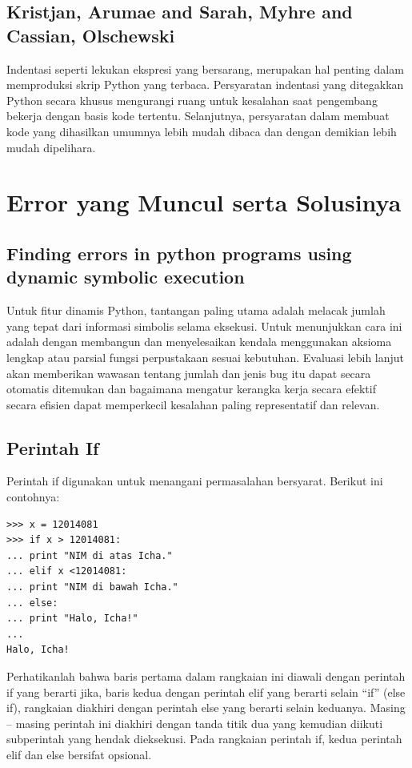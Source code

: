 \documentclass[12pt]{article}
\begin{document}
\subsection{Kristjan, Arumae and Sarah, Myhre and Cassian, Olschewski}
Indentasi seperti lekukan ekspresi yang bersarang, merupakan hal penting dalam memproduksi skrip Python yang terbaca. Persyaratan indentasi yang ditegakkan Python secara khusus mengurangi ruang untuk kesalahan saat pengembang bekerja dengan basis kode tertentu. Selanjutnya, persyaratan dalam membuat kode yang dihasilkan umumnya lebih mudah dibaca dan dengan demikian lebih mudah dipelihara\cite{kristjansoccer}.


\section{Error yang Muncul serta Solusinya}

\subsection{Finding errors in python programs using dynamic symbolic execution}
Untuk fitur dinamis Python, tantangan paling utama adalah melacak jumlah yang tepat dari informasi simbolis selama eksekusi. Untuk menunjukkan cara ini adalah dengan membangun dan menyelesaikan kendala menggunakan aksioma lengkap atau parsial fungsi perpustakaan sesuai kebutuhan. Evaluasi lebih lanjut akan memberikan wawasan tentang jumlah dan jenis bug itu dapat secara otomatis ditemukan dan bagaimana mengatur kerangka kerja secara efektif secara efisien dapat memperkecil kesalahan paling representatif dan relevan\cite{sapra2013finding}.

\subsection{Perintah If}
Perintah if digunakan untuk menangani permasalahan bersyarat. Berikut ini contohnya:
\begin{verbatim}
>>> x = 12014081
>>> if x > 12014081:
... print "NIM di atas Icha."
... elif x <12014081:
... print "NIM di bawah Icha."
... else:
... print "Halo, Icha!"
...
Halo, Icha!
\end{verbatim}

Perhatikanlah bahwa baris pertama dalam rangkaian ini diawali dengan perintah if yang berarti jika, baris kedua dengan perintah elif yang berarti selain “if” (else if), rangkaian diakhiri dengan perintah else yang berarti selain keduanya. Masing – masing perintah ini diakhiri dengan tanda titik dua yang kemudian diikuti subperintah yang hendak dieksekusi. Pada rangkaian perintah if, kedua perintah elif dan else bersifat opsional.
\end{document}
